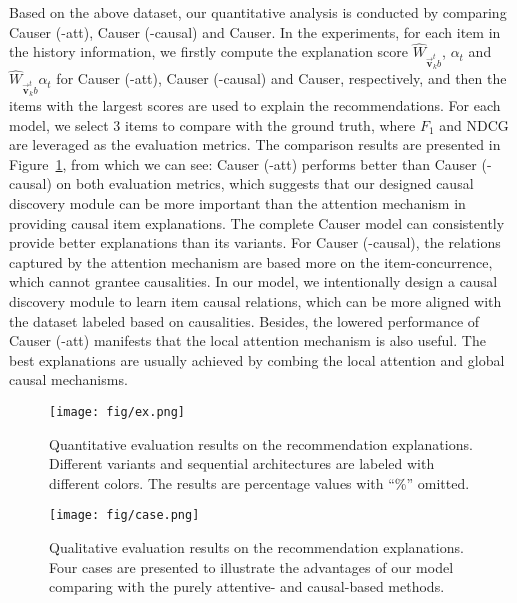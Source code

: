 \documentclass[conference]{IEEEtran}
\theoremstyle{definition}
\theoremstyle{theorem}
\theoremstyle{proof}
\theoremstyle{remark}
\begin{document}
Based on the above dataset, our quantitative analysis is conducted by comparing Causer (-att), Causer (-causal) and Causer.
In the experiments, for each item in the history information, we firstly compute the explanation score $\hat{{W}}_{\vec{\bm{v}}_k^{t}b}$, $\alpha_t$ and $\hat{{W}}_{\vec{\bm{v}}_k^{t}b}\alpha_t$ for Causer (-att), Causer (-causal) and Causer, respectively, and then the items with the largest scores are used to explain the recommendations.
For each model, we select 3 items to compare with the ground truth, where $F_1$ and NDCG are leveraged as the evaluation metrics.
The comparison results are presented in Figure~\ref{explane}, from which we can see:
Causer (-att) performs better than Causer (-causal) on both evaluation metrics, which suggests that our designed causal discovery module can be more important than the attention mechanism in providing causal item explanations.
The complete Causer model can consistently provide better explanations than its variants.
For Causer (-causal), the relations captured by the attention mechanism are based more on the item-concurrence, which cannot grantee causalities.
In our model, we intentionally design a causal discovery module to learn item causal relations, which can be more aligned with the dataset labeled based on causalities.
Besides, the lowered performance of Causer (-att) manifests that the local attention mechanism is also useful.
The best explanations are usually achieved by combing the local attention and global causal mechanisms.



\begin{figure}[t]
	\centering
	\setlength{\fboxrule}{0.pt}
	\setlength{\fboxsep}{0.pt}
	\texttt{[image: fig/ex.png]}
	\vspace{-0.2cm}
	\caption{Quantitative evaluation results on the recommendation explanations.
    Different variants and sequential architectures are labeled with different colors.
    {The results are percentage values with ``\%'' omitted.}
	}
	\label{explane}
	\vspace{-0.1cm}
\end{figure}


\begin{figure}[t]
	\centering
	\setlength{\fboxrule}{0.pt}
	\setlength{\fboxsep}{0.pt}
	\texttt{[image: fig/case.png]}
	\vspace{-0.4cm}
	\caption{Qualitative evaluation results on the recommendation explanations. 
	Four cases are presented to illustrate the advantages of our model comparing with the purely attentive- and causal-based methods.}
	\label{case}
	\vspace{-0.cm}
\end{figure}
\end{document}
